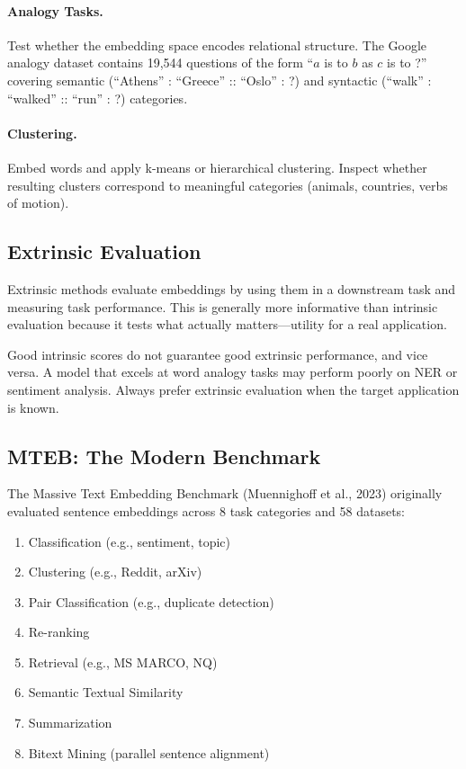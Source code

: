 \paragraph{Analogy Tasks.}
Test whether the embedding space encodes relational structure.  The Google
analogy dataset contains 19,544 questions of the form ``$a$ is to $b$ as $c$
is to ?''  covering semantic (``Athens'' : ``Greece'' :: ``Oslo'' : ?) and
syntactic (``walk'' : ``walked'' :: ``run'' : ?) categories.

\paragraph{Clustering.}
Embed words and apply k-means or hierarchical clustering.  Inspect whether
resulting clusters correspond to meaningful categories (animals, countries,
verbs of motion).

\subsection{Extrinsic Evaluation}

Extrinsic methods evaluate embeddings by using them in a downstream task and
measuring task performance.  This is generally more informative than intrinsic
evaluation because it tests what actually matters---utility for a real
application.

\begin{warningbox}
Good intrinsic scores do not guarantee good extrinsic performance, and vice
versa.  A model that excels at word analogy tasks may perform poorly on NER
or sentiment analysis.  Always prefer extrinsic evaluation when the target
application is known.
\end{warningbox}

\subsection{MTEB: The Modern Benchmark}

The Massive Text Embedding Benchmark (Muennighoff et al., 2023) originally
evaluated sentence embeddings across 8 task categories and 58 datasets:
\begin{enumerate}
    \item Classification (e.g., sentiment, topic)
    \item Clustering (e.g., Reddit, arXiv)
    \item Pair Classification (e.g., duplicate detection)
    \item Re-ranking
    \item Retrieval (e.g., MS MARCO, NQ)
    \item Semantic Textual Similarity
    \item Summarization
    \item Bitext Mining (parallel sentence alignment)
\end{enumerate}

